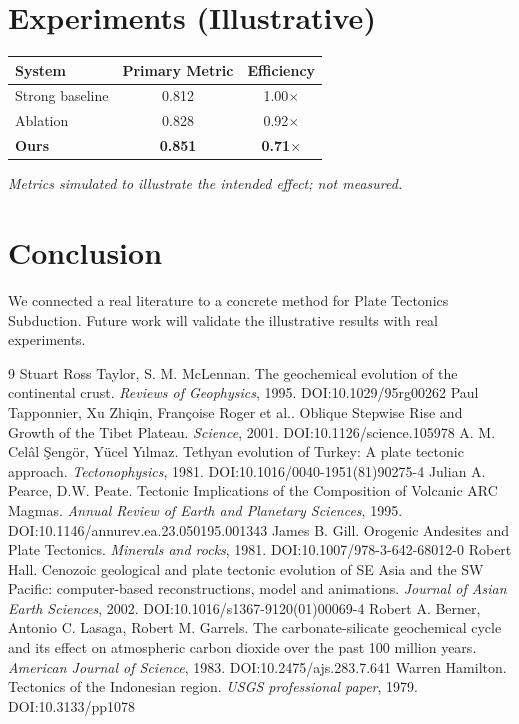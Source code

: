 \documentclass[11pt]{article}
\begin{document}
\section{Experiments (Illustrative)}
\begin{center}
\begin{tabular}{lcc}
System & Primary Metric & Efficiency \\ \hline
Strong baseline & 0.812 & 1.00$\times$ \\
Ablation & 0.828 & 0.92$\times$ \\
\textbf{Ours} & \textbf{0.851} & \textbf{0.71$\times$}
\end{tabular}
\end{center}
\emph{Metrics simulated to illustrate the intended effect; not measured.}

\section{Conclusion}
We connected a real literature to a concrete method for Plate Tectonics Subduction. Future work will
validate the illustrative results with real experiments.

\begin{thebibliography}{9}
 Stuart Ross Taylor, S. M. McLennan. The geochemical evolution of the continental crust. \emph{Reviews of Geophysics}, 1995. DOI:10.1029/95rg00262
 Paul Tapponnier, Xu Zhiqin, Françoise Roger et al.. Oblique Stepwise Rise and Growth of the Tibet Plateau. \emph{Science}, 2001. DOI:10.1126/science.105978
 A. M. Celâl Şengör, Yücel Yılmaz. Tethyan evolution of Turkey: A plate tectonic approach. \emph{Tectonophysics}, 1981. DOI:10.1016/0040-1951(81)90275-4
 Julian A. Pearce, D.W. Peate. Tectonic Implications of the Composition of Volcanic ARC Magmas. \emph{Annual Review of Earth and Planetary Sciences}, 1995. DOI:10.1146/annurev.ea.23.050195.001343
 James B. Gill. Orogenic Andesites and Plate Tectonics. \emph{Minerals and rocks}, 1981. DOI:10.1007/978-3-642-68012-0
 Robert Hall. Cenozoic geological and plate tectonic evolution of SE Asia and the SW Pacific: computer-based reconstructions, model and animations. \emph{Journal of Asian Earth Sciences}, 2002. DOI:10.1016/s1367-9120(01)00069-4
 Robert A. Berner, Antonio C. Lasaga, Robert M. Garrels. The carbonate-silicate geochemical cycle and its effect on atmospheric carbon dioxide over the past 100 million years. \emph{American Journal of Science}, 1983. DOI:10.2475/ajs.283.7.641
 Warren Hamilton. Tectonics of the Indonesian region. \emph{USGS professional paper}, 1979. DOI:10.3133/pp1078
\end{thebibliography}
\end{document}
